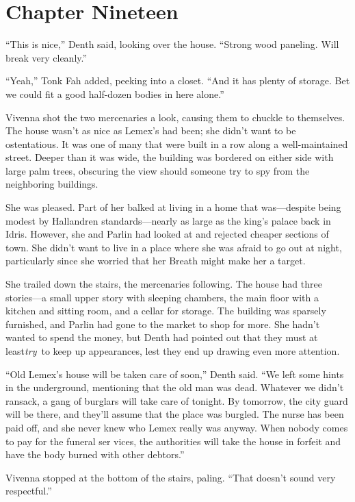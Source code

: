 \section{Chapter Nineteen}

“This is nice,” Denth said, looking over the house. “Strong wood paneling. Will break very cleanly.”

“Yeah,” Tonk Fah added, peeking into a closet. “And it has plenty of storage. Bet we could fit a good half-dozen bodies in here alone.”

Vivenna shot the two mercenaries a look, causing them to chuckle to themselves. The house wasn’t as nice as Lemex’s had been; she didn’t want to be ostentatious. It was one of many that were built in a row along a well-maintained street. Deeper than it was wide, the building was bordered on either side with large palm trees, obscuring the view should someone try to spy from the neighboring buildings.

She was pleased. Part of her balked at living in a home that was—despite being modest by Hallandren standards—nearly as large as the king’s palace back in Idris. However, she and Parlin had looked at and rejected cheaper sections of town. She didn’t want to live in a place where she was afraid to go out at night, particularly since she worried that her Breath might make her a target.

She trailed down the stairs, the mercenaries following. The house had three stories—a small upper story with sleeping chambers, the main floor with a kitchen and sitting room, and a cellar for storage. The building was sparsely furnished, and Parlin had gone to the market to shop for more. She hadn’t wanted to spend the money, but Denth had pointed out that they must at least\textit{try}~to keep up appearances, lest they end up drawing even more attention.

“Old Lemex’s house will be taken care of soon,” Denth said. “We left some hints in the underground, mentioning that the old man was dead. Whatever we didn’t ransack, a gang of burglars will take care of tonight. By tomorrow, the city guard will be there, and they’ll assume that the place was burgled. The nurse has been paid off, and she never knew who Lemex really was anyway. When nobody comes to pay for the funeral ser vices, the authorities will take the house in forfeit and have the body burned with other debtors.”

Vivenna stopped at the bottom of the stairs, paling. “That doesn’t sound very respectful.”

